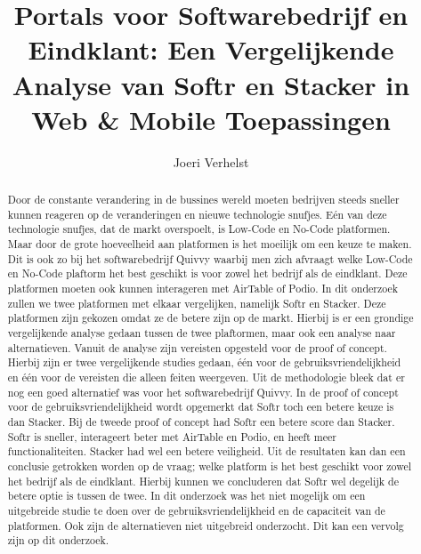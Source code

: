\documentclass{hogent-article}
\title{Portals voor Softwarebedrijf en Eindklant: Een Vergelijkende Analyse van Softr en Stacker in Web \& Mobile Toepassingen}
\author{Joeri Verhelst}
\begin{document}
\begin{abstract}
  Door de constante verandering in de bussines wereld moeten bedrijven steeds sneller kunnen reageren op de veranderingen en nieuwe technologie snufjes. Eén van deze technologie snufjes, dat de markt overspoelt, is
  Low-Code en No-Code platformen. Maar door de grote hoeveelheid aan platformen is het moeilijk om een keuze te maken. Dit is ook zo bij het softwarebedrijf Quivvy waarbij men zich afvraagt welke Low-Code en No-Code plaftorm
  het best geschikt is voor zowel het bedrijf als de eindklant. Deze platformen moeten ook kunnen interageren met AirTable of Podio. In dit onderzoek zullen we twee platformen met elkaar vergelijken, namelijk Softr en Stacker. Deze platformen zijn gekozen omdat ze de betere zijn
  op de markt. Hierbij is er een grondige vergelijkende analyse gedaan tussen de twee plaftormen, maar ook een analyse naar alternatieven. Vanuit de analyse zijn vereisten opgesteld voor de proof of concept.
  Hierbij zijn er twee vergelijkende studies gedaan, één voor de gebruiksvriendelijkheid en één voor de vereisten die alleen feiten weergeven. Uit de methodologie bleek dat er nog een goed alternatief was voor het softwarebedrijf Quivvy. In de proof of concept voor de gebruiksvriendelijkheid
  wordt opgemerkt dat Softr toch een betere keuze is dan Stacker. Bij de tweede proof of concept had Softr een betere score dan Stacker. Softr is sneller, interageert beter met AirTable en Podio, en heeft meer functionaliteiten. Stacker had wel 
  een betere veiligheid. Uit de resultaten kan dan een conclusie getrokken worden op de vraag; welke platform is het best geschikt voor zowel het bedrijf als de eindklant. Hierbij kunnen we concluderen dat Softr wel degelijk de betere optie 
  is tussen de twee. In dit onderzoek was het niet mogelijk om een uitgebreide studie te doen over de gebruiksvriendelijkheid en de capaciteit van de platformen. Ook zijn de alternatieven niet uitgebreid onderzocht. Dit kan een vervolg zijn op dit onderzoek.
\end{abstract}

\tableofcontents



\printbibliography[heading=bibintoc]
\end{document}
